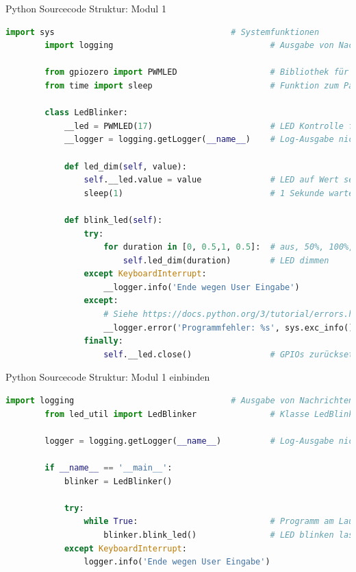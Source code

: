 \begin{frame}[fragile]{Python Sourcecode Struktur: Modul 1}
    \begin{lstlisting}[language=Python, gobble=8]
        import sys                                    # Systemfunktionen
        import logging                                # Ausgabe von Nachrichten

        from gpiozero import PWMLED                   # Bibliothek für PWM-Ansteuerung
        from time import sleep                        # Funktion zum Pausieren

        class LedBlinker:
            __led = PWMLED(17)                        # LED Kontrolle für GPIO PIN 17
            __logger = logging.getLogger(__name__)    # Log-Ausgabe nicht mit print()

            def led_dim(self, value):
                self.__led.value = value              # LED auf Wert setzen
                sleep(1)                              # 1 Sekunde warten

            def blink_led(self):
                try:
                    for duration in [0, 0.5,1, 0.5]:  # aus, 50%, 100%, 50%
                        self.led_dim(duration)        # LED dimmen
                except KeyboardInterrupt:
                    __logger.info('Ende wegen User Eingabe')
                except:
                    # Siehe https://docs.python.org/3/tutorial/errors.html
                    __logger.error('Programmfehler: %s', sys.exc_info()[0])
                finally:
                    self.__led.close()                # GPIOs zurücksetzen
    \end{lstlisting}
\end{frame}

\begin{frame}[fragile]{Python Sourcecode Struktur: Modul 1 einbinden}
    \begin{lstlisting}[language=Python, gobble=8]
        import logging                                # Ausgabe von Nachrichten
        from led_util import LedBlinker               # Klasse LedBlinker

        logger = logging.getLogger(__name__)          # Log-Ausgabe nicht mit print()

        if __name__ == '__main__':
            blinker = LedBlinker()

            try:
                while True:                           # Programm am Laufen halten
                    blinker.blink_led()               # LED blinken lassen
            except KeyboardInterrupt:
                logger.info('Ende wegen User Eingabe')
    \end{lstlisting}
\end{frame}

